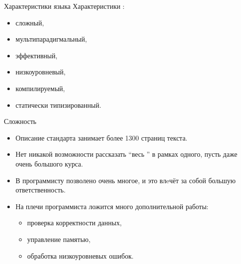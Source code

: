 \documentclass[aspectration=1610,t]{beamer}
\begin{document}
\begin{frame}{Характеристики языка \langcpp}
    Характеристики \langcpp:
    \begin{itemize}
        \item сложный,
        \item мультипарадигмальный,
        \item эффективный,
        \item низкоуровневый,
        \item компилируемый,
        \item статически типизированный.
    \end{itemize}
\end{frame}

\begin{frame}[fragile]{Сложность}
    \begin{itemize}
        \item 
            Описание стандарта занимает более 1300 страниц текста.

        \item  Нет никакой возможности рассказать ``весь \langcpp'' в рамках
            одного, пусть даже очень большого курса.

        \item В \langcpp программисту позволено очень многое, и это влeчёт за
            собой большую ответственность.

        \item На плечи программиста ложится много дополнительной
            работы:
            \begin{itemize}
                \item проверка корректности данных, 
                \item управление памятью, 
                \item обработка низкоуровневых ошибок.
            \end{itemize}
    \end{itemize}
\end{frame}
\end{document}
